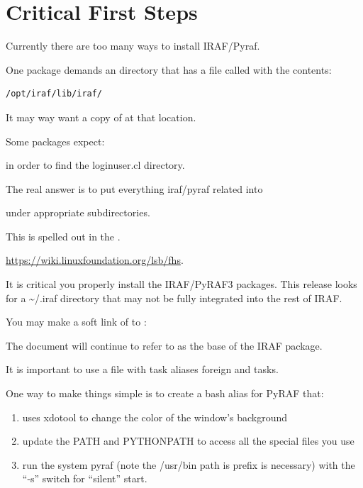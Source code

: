 
\renewcommand{\footerfilename}{Install.tex}

\section{Critical First Steps}

Currently there are too many ways to install IRAF/Pyraf.

One package demands an  directory that has a file called 
with the contents:
\begingroup \fontsize{10pt}{10pt}
\selectfont
\begin{verbatim} 
/opt/iraf/lib/iraf/
\end{verbatim}
\endgroup
It may way want a copy of  at that location.

Some packages expect:



in order to find the loginuser.cl directory.

The real answer is to put everything iraf/pyraf related into

 under appropriate subdirectories.

This is spelled out in the  .

\url{https://wiki.linuxfoundation.org/lsb/fhs}.


It is critical you properly install the IRAF/PyRAF3 packages. This
release looks for a {\textasciitilde}/.iraf directory that may not be fully integrated
into the rest of IRAF.

You may make a soft link of  to :


The document will continue to refer to  as the base
of the IRAF package. 

It is important to use a  file with task
aliases foreign and tasks. 

One way to make things simple is to create a bash alias for PyRAF that:
\vspace{-.15cm}
\begin{enumerate}\addtolength{\itemsep}{-0.5\baselineskip}
   \item   uses xdotool to change the color of the window's background
   \item   update the PATH and PYTHONPATH to access all the special files you use
   \item   run the system pyraf (note the /usr/bin path is prefix is necessary) 
 with the ``-s'' switch for ``silent'' start.
\end{enumerate}


